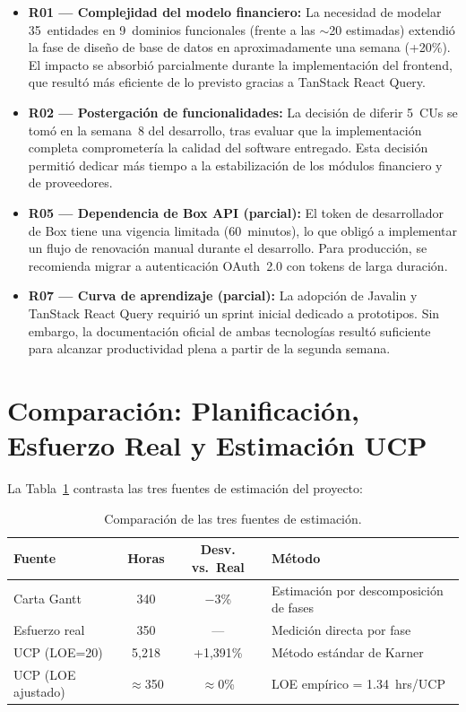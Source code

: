 \begin{itemize}
    \item \textbf{R01 --- Complejidad del modelo financiero:} La necesidad de modelar 35~entidades en 9~dominios funcionales (frente a las $\sim$20 estimadas) extendió la fase de diseño de base de datos en aproximadamente una semana (+20\%). El impacto se absorbió parcialmente durante la implementación del frontend, que resultó más eficiente de lo previsto gracias a TanStack React Query.

    \item \textbf{R02 --- Postergación de funcionalidades:} La decisión de diferir 5~CUs se tomó en la semana~8 del desarrollo, tras evaluar que la implementación completa comprometería la calidad del software entregado. Esta decisión permitió dedicar más tiempo a la estabilización de los módulos financiero y de proveedores.

    \item \textbf{R05 --- Dependencia de Box API (parcial):} El token de desarrollador de Box tiene una vigencia limitada (60~minutos), lo que obligó a implementar un flujo de renovación manual durante el desarrollo. Para producción, se recomienda migrar a autenticación OAuth~2.0 con tokens de larga duración.

    \item \textbf{R07 --- Curva de aprendizaje (parcial):} La adopción de Javalin y TanStack React Query requirió un sprint inicial dedicado a prototipos. Sin embargo, la documentación oficial de ambas tecnologías resultó suficiente para alcanzar productividad plena a partir de la segunda semana.
\end{itemize}

\section{Comparación: Planificación, Esfuerzo Real y Estimación UCP}

La Tabla~\ref{tab:comparacion-retro} contrasta las tres fuentes de estimación del proyecto:

\begin{table}[H]
\centering
\begin{tabular}{|p{}|c|c|p{}|}
\hline
\textbf{Fuente} & \textbf{Horas} & \textbf{Desv. vs.\ Real} & \textbf{Método} \\
\hline
Carta Gantt & 340 & $-$3\% & Estimación por descomposición de fases \\
\hline
Esfuerzo real & 350 & --- & Medición directa por fase \\
\hline
UCP (LOE=20) & 5{,}218 & +1{,}391\% & Método estándar de Karner \\
\hline
UCP (LOE ajustado) & $\approx$350 & $\approx$0\% & LOE empírico = 1.34~hrs/UCP \\
\hline
\end{tabular}
\caption{Comparación de las tres fuentes de estimación.}
\label{tab:comparacion-retro}
\end{table}

